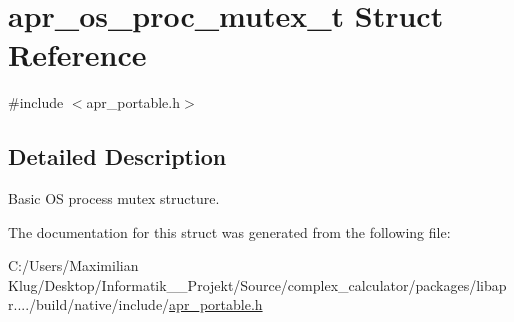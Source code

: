 \hypertarget{structapr__os__proc__mutex__t}{}\section{apr\+\_\+os\+\_\+proc\+\_\+mutex\+\_\+t Struct Reference}
\label{structapr__os__proc__mutex__t}


{\ttfamily \#include $<$apr\+\_\+portable.\+h$>$}



\subsection{Detailed Description}
Basic OS process mutex structure. 

The documentation for this struct was generated from the following file\+:\begin{DoxyCompactItemize}
\item 
C\+:/\+Users/\+Maximilian Klug/\+Desktop/\+Informatik\+\_\+\_\+\+Projekt/\+Source/complex\+\_\+calculator/packages/libapr..../build/native/include/\mbox{\hyperlink{apr__portable_8h}{apr\+\_\+portable.\+h}}\end{DoxyCompactItemize}
